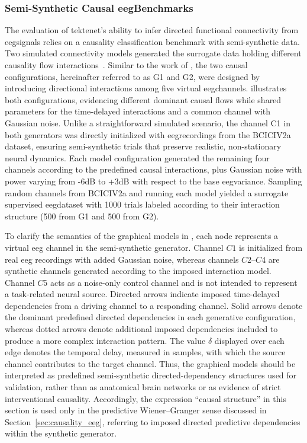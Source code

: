\subsubsection{Semi-Synthetic Causal \gls{eeg}Benchmarks} \label{sec:synthetic_validation}
The evaluation of \gls{tektenet}'s ability to infer directed functional connectivity from \gls{eeg}signals relies on a causality classification benchmark with semi-synthetic data. Two simulated connectivity models generated the surrogate data holding different causality flow interactions~\cite{faes2011information,weber2017}. Similar to the work of \cite{kus2004}, the two causal configurations, hereinafter referred to as G1 and G2, were designed by introducing directional interactions among five virtual \gls{eeg}channels.  illustrates both configurations, evidencing different dominant causal flows while shared parameters for the time-delayed interactions and a common channel with Gaussian noise. Unlike a straightforward simulated scenario, the channel C1 in both generators was directly initialized with \gls{eeg}recordings from the BCICIV2a dataset, ensuring semi-synthetic trials that preserve realistic, non-stationary neural dynamics. Each model configuration generated the remaining four channels according to the predefined causal interactions, plus Gaussian noise with power varying from -6dB to +3dB with respect to the base \gls{eeg}variance. Sampling random channels from BCICIV2a and running each model yielded a surrogate supervised \gls{eeg}dataset with 1000 trials labeled according to their interaction structure (500 from G1 and 500 from G2).

{To clarify the semantics of the graphical models in , each node represents a virtual \gls{eeg} channel in the semi-synthetic generator. Channel \(C1\) is initialized from real \gls{eeg} 
recordings with added Gaussian noise, whereas channels \(C2\)--\(C4\) are synthetic channels generated according to the imposed interaction model. Channel \(C5\) acts as a noise-only control channel and is not intended to represent a task-related neural source. Directed arrows indicate imposed time-delayed dependencies from a driving channel to a responding channel. Solid arrows denote the dominant predefined directed dependencies in each generative configuration, whereas dotted arrows denote additional imposed dependencies included to produce 
a more complex interaction pattern. The value \(\delta\) displayed over each edge denotes the temporal delay, measured in samples, with which the source channel contributes to the target channel. Thus, the graphical models should be interpreted as predefined semi-synthetic directed-dependency structures used for validation, rather than as anatomical brain networks or as evidence of strict interventional causality. Accordingly, the expression ``causal structure'' in this section is used 
only in the predictive Wiener--Granger sense discussed in 
Section~\ref{sec:causality_eeg}, referring to imposed directed predictive 
dependencies within the synthetic generator.}

